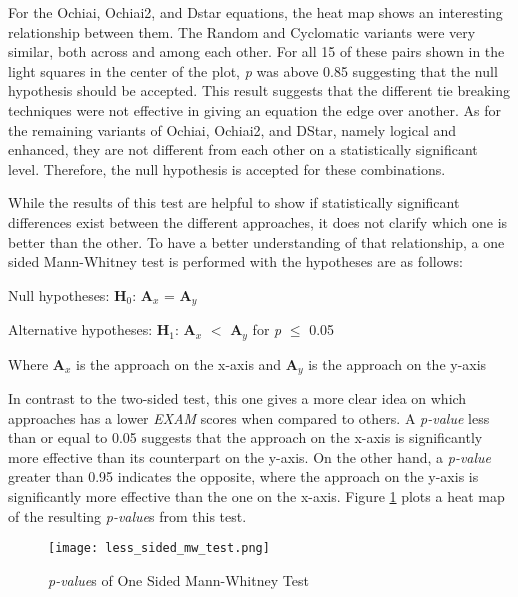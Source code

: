 For the Ochiai, Ochiai2, and Dstar equations, the heat map shows an interesting
relationship between them. The Random and Cyclomatic variants were very similar,
both across and among each other. For all 15 of these pairs shown in the light
squares in the center of the plot,
\emph{p} was above 0.85 suggesting that the null hypothesis should be accepted.
This result suggests that the different tie breaking techniques were not
effective in giving an equation the edge over another.
As for the remaining variants of Ochiai, Ochiai2, and DStar, namely logical and
enhanced, they are not different from each other on a statistically significant
level. Therefore, the null hypothesis is accepted for these combinations.

While the results of this test are helpful to show if statistically significant
differences exist between the different approaches, it does not clarify which
one is better than the other. To have a better understanding of that
relationship, a one sided  Mann-Whitney test is performed with the
hypotheses are as follows:

\begin{center}
    Null hypotheses: \textbf{H$_{0}$}: \textbf{A$_{x}$} = \textbf{A$_{y}$}

    Alternative hypotheses: \textbf{H$_{1}$}: \textbf{A$_{x}$} $<$
    \textbf{A$_{y}$}
    for \emph{p} $\leq$  0.05

    Where \textbf{A$_{x}$} is the approach on the x-axis and \textbf{A$_{y}$} is
    the approach on the y-axis
\end{center}

In contrast to the two-sided test, this one gives a more clear idea on which
approaches has a lower \emph{EXAM} scores when compared to others. A \emph{p-value}
less than or equal to 0.05 suggests that the approach on the x-axis is
significantly more effective than its counterpart on the y-axis. On the other
hand, a \emph{p-value} greater than 0.95 indicates the opposite, where the
approach on the y-axis is significantly more effective than the one on the x-axis. Figure
\ref{fig:one_sided_mw_test} plots a heat map of the resulting \emph{p-value}s
from this test.

\begin{figure}[!htb]
	\begin{center}
		\texttt{[image: less\_sided\_mw\_test.png]}
        \caption{\label{fig:one_sided_mw_test} \emph{p-value}s of One Sided Mann-Whitney Test}
	\end{center}
\end{figure}

